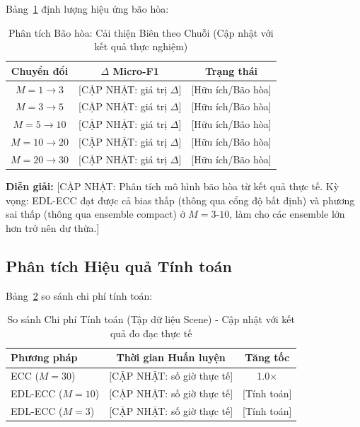 \documentclass[conference]{IEEEtran}
\begin{document}
Bảng~\ref{tab:saturation_analysis} định lượng hiệu ứng bão hòa:

\begin{table}[t]
\centering
\caption{Phân tích Bão hòa: Cải thiện Biên theo Chuỗi (Cập nhật với kết quả thực nghiệm)}
\label{tab:saturation_analysis}
\small
\begin{tabular}{ccc}
\toprule
\textbf{Chuyển đổi} & \textbf{$\Delta$ Micro-F1} & \textbf{Trạng thái} \\
\midrule
$M=1 \to 3$ & [CẬP NHẬT: giá trị $\Delta$] & [Hữu ích/Bão hòa] \\
$M=3 \to 5$ & [CẬP NHẬT: giá trị $\Delta$] & [Hữu ích/Bão hòa] \\
$M=5 \to 10$ & [CẬP NHẬT: giá trị $\Delta$] & [Hữu ích/Bão hòa] \\
$M=10 \to 20$ & [CẬP NHẬT: giá trị $\Delta$] & [Hữu ích/Bão hòa] \\
$M=20 \to 30$ & [CẬP NHẬT: giá trị $\Delta$] & [Hữu ích/Bão hòa] \\
\bottomrule
\end{tabular}
\end{table}

\textbf{Diễn giải:} [CẬP NHẬT: Phân tích mô hình bão hòa từ kết quả thực tế. Kỳ vọng: EDL-ECC đạt được cả bias thấp (thông qua cổng độ bất định) và phương sai thấp (thông qua ensemble compact) ở $M=3$-$10$, làm cho các ensemble lớn hơn trở nên dư thừa.]

\subsection{Phân tích Hiệu quả Tính toán}

Bảng~\ref{tab:efficiency} so sánh chi phí tính toán:

\begin{table}[t]
\centering
\caption{So sánh Chi phí Tính toán (Tập dữ liệu Scene) - Cập nhật với kết quả đo đạc thực tế}
\label{tab:efficiency}
\small
\begin{tabular}{lcc}
\toprule
\textbf{Phương pháp} & \textbf{Thời gian Huấn luyện} & \textbf{Tăng tốc} \\
\midrule
ECC ($M=30$) & [CẬP NHẬT: số giờ thực tế] & 1.0$\times$ \\
EDL-ECC ($M=10$) & [CẬP NHẬT: số giờ thực tế] & [Tính toán] \\
EDL-ECC ($M=3$) & [CẬP NHẬT: số giờ thực tế] & [Tính toán] \\
\bottomrule
\end{tabular}
\end{table}
\end{document}
